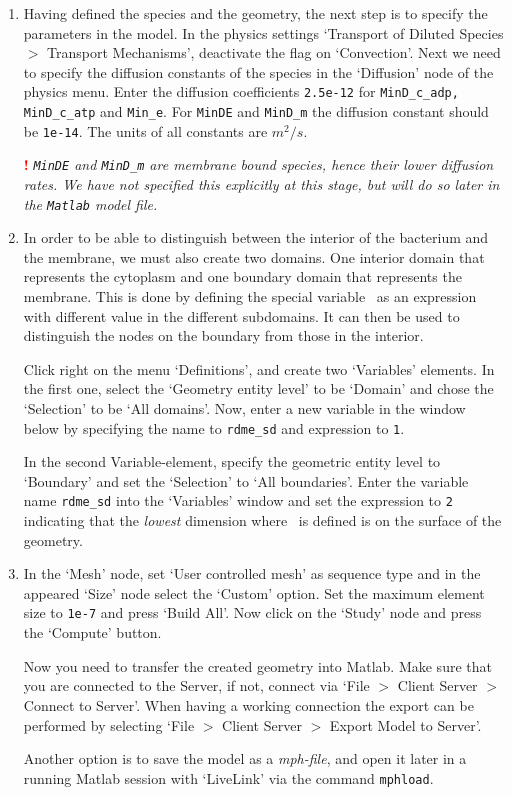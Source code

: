 \begin{enumerate}
\item Having defined the species and the geometry, the next step is to
  specify the parameters in the model. In the physics settings  `Transport of Diluted Species $>$
  Transport Mechanisms', deactivate the flag on `Convection'.
  Next we need to specify the diffusion constants of the species in the `Diffusion' node of the physics menu.
  Enter the diffusion coefficients \texttt{2.5e-12} for \texttt{MinD\_c\_adp,
    MinD\_c\_atp} and \texttt{Min\_e}. For \texttt{MinDE} and
  \texttt{MinD\_m} the diffusion constant should be \texttt{1e-14}. The units of all constants are $m^2/s$.
  
  \smallskip 
   
  {\bf \textcolor{red}{!}} \emph{\texttt{MinDE} and \texttt{MinD\_m}
    are membrane bound species, hence their lower diffusion rates. We
    have not specified this explicitly at this stage, but will do so
    later in the \texttt{Matlab} model file.}

\item In order to be able to distinguish between the interior of the
  bacterium and the membrane, we must also create two domains. One
  interior domain that represents the cytoplasm and one boundary
  domain that represents the membrane. This is done by defining the
  special variable \varrdmesd\ as an expression with different value
  in the different subdomains. It can then be used to distinguish the
  nodes on the boundary from those in the interior. 
  
  Click right on the menu `Definitions', and create two `Variables' elements.
  In the first one, select the `Geometry entity level' to be `Domain' and chose
  the `Selection' to be `All domains'.  Now, enter a new variable in the window below
  by specifying the name to \texttt{rdme\_sd} and expression to \texttt{1}.
  
  In the second Variable-element, specify the geometric entity level to `Boundary'
  and set the `Selection' to `All boundaries'. Enter the variable name \texttt{rdme\_sd} into
  the `Variables' window and set the expression to \texttt{2} indicating that the \emph{lowest}
  dimension where \varrdmesd\ is defined is on the surface of the
  geometry.

\item In the `Mesh' node, set `User controlled mesh' as sequence type and
  in the appeared `Size' node select the `Custom' option.  Set the maximum element size to
  \texttt{1e-7} and press `Build All'.  Now click on the `Study' node and press the `Compute' button.  
  
  Now you need to transfer the created geometry into Matlab. Make sure that you are connected to the Server, if not,
  connect via `File $>$ Client Server $>$ Connect to Server'.
  When having a working connection the export can be performed by selecting `File $>$ Client Server $>$ Export Model to Server'.
  
  Another option is to save the model as a \textit{mph-file}, and open it later in a  running Matlab
  session with `LiveLink' via the command \texttt{mphload}.
\end{enumerate}

